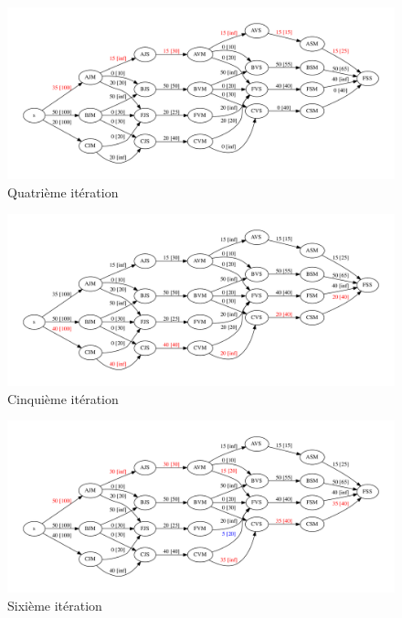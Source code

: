 \begin{figure}[h]
\begin{center}
	\includegraphics[width=\textwidth]{figs/pass-5.pdf}
	\caption{Quatrième itération}
	\label{fig:pass:cinq}
\end{center}
\end{figure}

\begin{figure}[h]
\begin{center}
	\includegraphics[width=\textwidth]{figs/pass-6.pdf}
	\caption{Cinquième itération}
	\label{fig:pass:six}
\end{center}
\end{figure}

\begin{figure}[h]
\begin{center}
	\includegraphics[width=\textwidth]{figs/pass-7.pdf}
	\caption{Sixième itération}
	\label{fig:pass:sept}
\end{center}
\end{figure}

